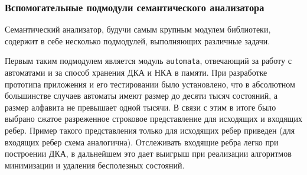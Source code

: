 \subsubsection{Вспомогательные подмодули семантического анализатора} %

Семантический анализатор, будучи самым крупным модулем библиотеки, содержит в себе несколько подмодулей, 
выполняющих различные задачи.

Первым таким подмодулем является модуль \texttt{automata}, отвечающий за работу с автоматами и за способ хранения ДКА и НКА в памяти. При разработке прототипа приложения и его тестировании было установлено, что 
в абсолютном большинстве случаев автоматы имеют размер до десяти тысяч состояний, а размер алфавита не превышает одной тысячи.
В связи с этим в итоге было выбрано сжатое разреженное строковое представление для исходящих и входящих ребер. Пример такого представления только для исходящих ребер приведен  (для входящих ребер схема аналогична). Отслеживать входящие ребра легко при построении ДКА, в дальнейшем это дает выигрыш при реализации алгоритмов минимизации и удаления бесполезных состояний.

